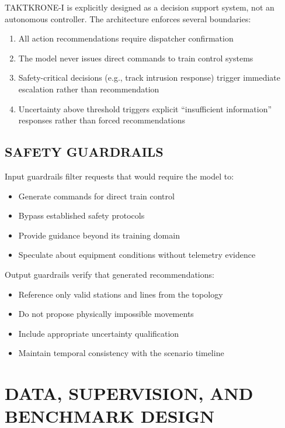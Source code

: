 \documentclass{IEEEoj}
\begin{document}
TAKTKRONE-I is explicitly designed as a decision support system, not an autonomous controller. The architecture enforces several boundaries:

\begin{enumerate}
    \item All action recommendations require dispatcher confirmation
    \item The model never issues direct commands to train control systems
    \item Safety-critical decisions (e.g., track intrusion response) trigger immediate escalation rather than recommendation
    \item Uncertainty above threshold triggers explicit ``insufficient information'' responses rather than forced recommendations
\end{enumerate}

\subsection{SAFETY GUARDRAILS}

Input guardrails filter requests that would require the model to:
\begin{itemize}
    \item Generate commands for direct train control
    \item Bypass established safety protocols
    \item Provide guidance beyond its training domain
    \item Speculate about equipment conditions without telemetry evidence
\end{itemize}

Output guardrails verify that generated recommendations:
\begin{itemize}
    \item Reference only valid stations and lines from the topology
    \item Do not propose physically impossible movements
    \item Include appropriate uncertainty qualification
    \item Maintain temporal consistency with the scenario timeline
\end{itemize}

\section{DATA, SUPERVISION, AND BENCHMARK DESIGN}
\label{sec:data}
\end{document}
